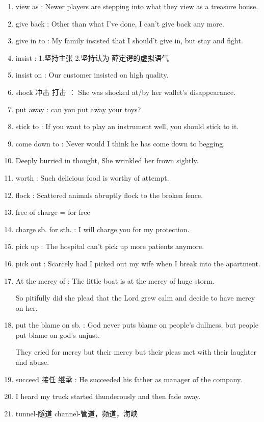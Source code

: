 \documentclass[utf8]{ctexart}
\begin{document}
\begin{enumerate}
				\item view as : Newer players are stepping into what they view as a treasure house.
				\item give back : Other than what I've done, I can't give back any more.
				\item give in to : My family insisted that I should't give in, but stay and fight.
				\item insist : 1.坚持主张 2.坚持认为  薛定谔的虚拟语气
				\item insist on : Our customer insisted on high quality.
				\item shock 冲击 打击 ： She was shocked at/by her wallet's disappearance.
				\item put away : can you put away your toys?
				\item stick to : If you want to play an instrument well, you should stick to it.
				\item come down to : Never would I think he has come down to begging.
				\item Deeply burried in thought, She wrinkled her frown sightly.
				\item worth : Such delicious food is worthy of attempt.
				\item flock : Scattered animals abruptly flock to the broken fence.
				\item free of charge = for free	 
				\item charge sb. for sth. : I will charge you for my protection.
				\item pick up : The hospital can't pick up more patients anymore.
				\item pick out : Scarcely had I picked out my wife when I break into the apartment.		
				\item At the mercy of : The little boat is at the mercy of huge storm.
				\par So pitifully did she plead that the Lord grew calm and decide to have mercy on her.
				 \item put the blame on sb. : God never puts blame on people's dullness, but people put blame on god's unjust.
				\par They cried for mercy but their mercy but their pleas met with their laughter and abuse.
				\item succeed 接任 继承 : He succeeded his father as manager of the company.
				\item I heard my truck started thunderously and then fade away.	
				\item tunnel-隧道 channel-管道，频道，海峡	

\end{enumerate}
\end{document}
